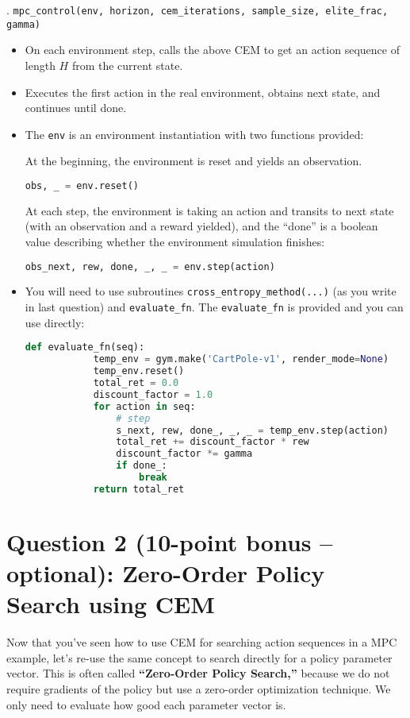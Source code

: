 \documentclass{article}
\begin{document}
. \texttt{mpc\_control(env, horizon, cem\_iterations, sample\_size, elite\_frac, gamma)}
\begin{itemize}
    \item On each environment step, calls the above CEM to get an action sequence of length $H$ from the current state.
    \item Executes the first action in the real environment, obtains next state, and continues until done.
    \item The \texttt{env} is an environment instantiation with two functions provided:
    
At the beginning, the environment is reset and yields an observation.    
\begin{lstlisting}[language=Python]
obs, _ = env.reset()
\end{lstlisting}
At each step, the environment is taking an action and transits to next state (with an observation and a reward yielded), and the ``done'' is a boolean value describing whether the environment simulation finishes:
\begin{lstlisting}[language=Python]
obs_next, rew, done, _, _ = env.step(action)
\end{lstlisting}
    \item You will need to use subroutines \texttt{cross\_entropy\_method(...)} (as you write in last question) and \texttt{evaluate\_fn}. The \texttt{evaluate\_fn} is provided and you can use directly:
    \begin{lstlisting}[language=Python]
        def evaluate_fn(seq):
            temp_env = gym.make('CartPole-v1', render_mode=None)
            temp_env.reset()
            total_ret = 0.0
            discount_factor = 1.0
            for action in seq:
                # step
                s_next, rew, done_, _, _ = temp_env.step(action)
                total_ret += discount_factor * rew
                discount_factor *= gamma
                if done_:
                    break
            return total_ret
\end{lstlisting}
\end{itemize}


\section*{Question 2 (10-point bonus -- optional): Zero-Order Policy Search using CEM}

\noindent Now that you've seen how to use CEM for searching action sequences in a MPC example, let's re-use the same concept to search directly for a policy parameter vector. This is often called \textbf{``Zero-Order Policy Search,''} because we do not require gradients of the policy but use a zero-order optimization technique. We only need to evaluate how good each parameter vector is.
\end{document}
